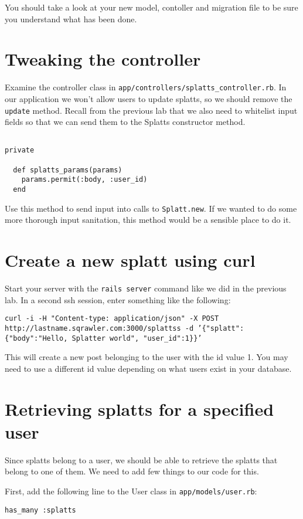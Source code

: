\documentclass{article}
\begin{document}
You should take a look at your new model, contoller and migration file to be sure you understand what has been done.

\section{Tweaking the controller}
Examine the controller class in \texttt{app/controllers/splatts\_controller.rb}. In our application we won't allow users to update splatts, so we should remove the \texttt{update} method. Recall from the previous lab that we also need to whitelist input fields so that we can send them to the Splatts constructor method.


\begin{verbatim}

private
  
  def splatts_params(params)
    params.permit(:body, :user_id)
  end
\end{verbatim}

Use this method to send input into calls to \texttt{Splatt.new}.  If we wanted to do some more thorough input sanitation, this method would be a sensible place to do it.

\section{Create a new splatt using curl}
Start your server with the \texttt{rails server} command like we did in the previous lab. In a second ssh session, enter something like the following:

\texttt{curl -i -H "Content-type: application/json" -X POST http://lastname.sqrawler.com:3000/splattss -d '\{"splatt": \{"body":"Hello, Splatter world", "user\_id":1\}\}'}
  
This will create a new post belonging to the user with the id value 1.  You may need to use a different id value depending on what users exist in your database.

\section{Retrieving splatts for a specified user}
Since splatts belong to a user, we should be able to retrieve the splatts that belong to one of them.  We need to add few things to our code for this.

First, add the following line to the User class in \texttt{app/models/user.rb}:

\texttt{has\_many :splatts}
\end{document}
